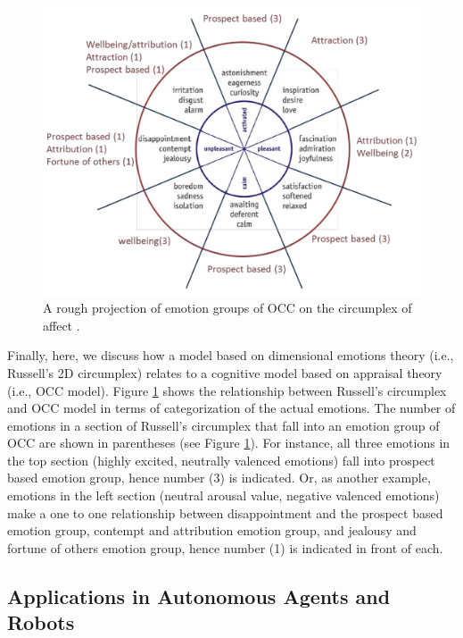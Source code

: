 \documentclass[12pt]{report}
\begin{document}
\begin{figure}[tbh]
  \center
  \includegraphics[width=.9\textwidth]{figure/occ-circumplex-mapping.png}
  \caption{A rough projection of emotion groups of OCC on the circumplex of
  affect \cite{ahmadpour:occ-dimensional-comparison}.}
  \label{fig:occ-circumplex}
\end{figure}

Finally, here, we discuss how a model based on dimensional emotions theory
(i.e., Russell's 2D circumplex) relates to a cognitive model based on appraisal
theory (i.e., OCC model). Figure \ref{fig:occ-circumplex} shows the relationship
between Russell's circumplex and OCC model in terms of categorization of the
actual emotions. The number of emotions in a section of Russell's circumplex
that fall into an emotion group of OCC are shown in parentheses (see Figure
\ref{fig:occ-circumplex}). For instance, all three emotions in the top section
(highly excited, neutrally valenced emotions) fall into prospect based emotion
group, hence number (3) is indicated. Or, as another example, emotions in the
left section (neutral arousal value, negative valenced emotions) make a one to
one relationship between disappointment and the prospect based emotion group,
contempt and attribution emotion group, and jealousy and fortune of others
emotion group, hence number (1) is indicated in front of each.

\subsection{Applications in Autonomous Agents and Robots}
\label{sec:applications}
\end{document}

